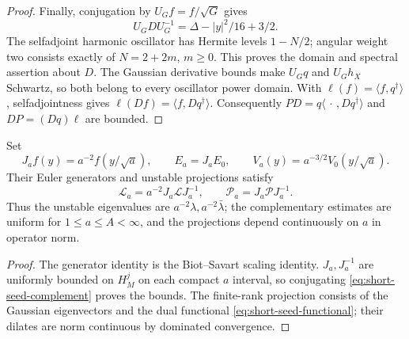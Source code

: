 \begin{proof}
Finally, conjugation by $U_Gf=f/\sqrt G$ gives
\[
 U_GDU_G^{-1}=\Delta-|y|^2/16+3/2.
\]
The selfadjoint harmonic oscillator has Hermite levels
$1-N/2$; angular weight two consists exactly of $N=2+2m$,
$m\ge0$. This proves the domain and spectral assertion about $D$.
The Gaussian derivative bounds make $U_Gq$ and $U_Gh_X$ Schwartz,
so both belong to every oscillator power domain. With
$\ell(f)=\langle f,q^\dagger\rangle$, selfadjointness gives
$\ell(Df)=\langle f,Dq^\dagger\rangle$. Consequently
$PD=q\langle\,\cdot\,,Dq^\dagger\rangle$ and
$DP=(Dq)\ell$ are bounded.
\end{proof}

\begin{corollary}\label{cor:short-seed-dilation}
Set
\[
 J_af(y)=a^{-2}f(y/\sqrt a),\qquad
 E_a=J_aE_0,\qquad V_a(y)=a^{-3/2}V_0(y/\sqrt a).
\]
Their Euler generators and unstable projections satisfy
\[
 \mathscr L_a=a^{-2}J_a\mathscr LJ_a^{-1},\qquad
 \mathscr P_a=J_a\mathscr PJ_a^{-1}.
\]
Thus the unstable eigenvalues are $a^{-2}\lambda,a^{-2}\bar\lambda$;
the complementary estimates are uniform for $1\le a\le A<\infty$,
and the projections depend continuously on $a$ in operator norm.
\end{corollary}
\begin{proof}
The generator identity is the Biot--Savart scaling identity.
$J_a,J_a^{-1}$ are uniformly bounded on $H^j_M$ on each compact
$a$ interval, so conjugating \eqref{eq:short-seed-complement} proves
the bounds. The finite-rank projection consists of the Gaussian
eigenvectors and the dual functional \eqref{eq:short-seed-functional};
their dilates are norm continuous by dominated convergence.
\end{proof}
